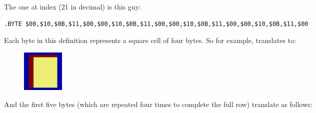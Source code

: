The one at index  (21 in decimal) is this guy:

\begin{lstlisting}[basicstyle=\scriptsize\ttfamily,escapechar=\%]
.BYTE $00,$10,$0B,$11,$00,$00,$10,$0B,$11,$00,$00,$10,$0B,$11,$00,$00,$10,$0B,$11,$00
\end{lstlisting}

Each byte in this definition represents a square cell of four bytes. So for example, 
translates to:

\begin{figure}[H]
  {
    \begin{adjustbox}{width=2cm,center}
        \includegraphics[width=2cm]{src/bonusphase/row21_cell0.png}%
    \end{adjustbox}
  }
\end{figure}

\captionsetup[subfigure]{font=large,labelfont=large,labelformat=empty}
\vspace{-0.5cm}
And the first five bytes (which are repeated four times to complete the full row) translate as follows:

